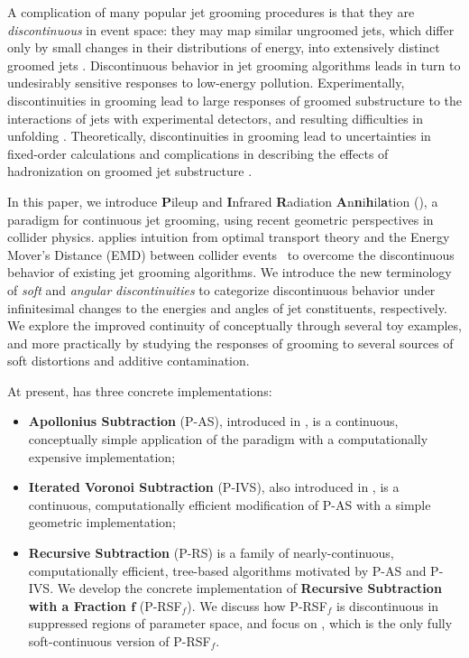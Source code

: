 A complication of many popular jet grooming procedures is that they are \textit{discontinuous} in event space:
%
they may map similar ungroomed jets, which differ only by small changes in their distributions of energy, into extensively distinct groomed jets \cite{Dasgupta:2013ihk,Larkoski:2014wba}.
%
Discontinuous behavior in jet grooming algorithms leads in turn to undesirably sensitive responses to low-energy pollution.
%
Experimentally, discontinuities in grooming lead to large responses of groomed substructure to the interactions of jets with experimental detectors, and resulting difficulties in unfolding \cite{ATL-PHYS-PUB-2019-027,Aad:2019vyi,ATLAS:2020gwe}.
%
Theoretically, discontinuities in grooming lead to uncertainties in fixed-order calculations \cite{Larkoski:2014wba} and complications in describing the effects of hadronization on groomed jet substructure \cite{Hoang:2019ceu}.

In this paper, we introduce \textbf{P}ileup and \textbf{I}nfrared \textbf{R}adiation \textbf{A}n\textbf{n}i\textbf{h}il\textbf{a}tion (\PIRANHA{}), a paradigm for continuous jet grooming, using recent geometric perspectives in collider physics.
%
\PIRANHA{} applies intuition from optimal transport theory and the Energy Mover's Distance (EMD) between collider events~\cite{Komiske:2019fks,Komiske:2020qhg} to overcome the discontinuous behavior of existing jet grooming algorithms.
%
We introduce the new terminology of \textit{soft} and \textit{angular} \textit{discontinuities} to categorize discontinuous behavior under infinitesimal changes to the energies and angles of jet constituents, respectively.
%
We explore the improved continuity of \PIRANHA{} conceptually through several toy examples, and more practically by studying the responses of \PIRANHA{} grooming to several sources of soft distortions and additive contamination.

At present, \PIRANHA{} has three concrete implementations:
\begin{itemize}
    \item
    \textbf{Apollonius Subtraction} (P-AS), introduced in , is a continuous, conceptually simple application of the \PIRANHA{} paradigm with a computationally expensive implementation;

    \item
    \textbf{Iterated Voronoi Subtraction} (P-IVS), also introduced in , is a continuous, computationally efficient modification of P-AS with a simple geometric implementation;

    \item
    \textbf{Recursive Subtraction} (P-RS) is a family of nearly-continuous, computationally efficient, tree-based algorithms motivated by P-AS and P-IVS.
    We develop the concrete implementation of \textbf{Recursive Subtraction with a Fraction \(\boldsymbol{f}\)} (P-RSF\(_f\)).
    We discuss how P-RSF\(_f\) is discontinuous in suppressed regions of parameter space, and focus on , which is the only fully soft-continuous version of P-RSF\(_f\).
\end{itemize}

